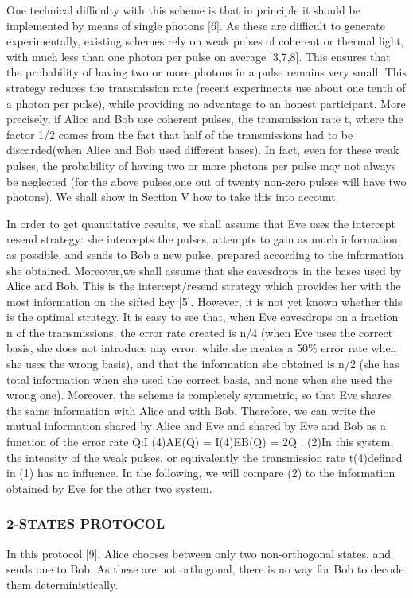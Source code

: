 One technical difficulty with this scheme is that in principle it should be implemented by means of single photons [6]. As these are difficult to generate experimentally, existing schemes rely on weak pulses of coherent or thermal light, with much less than one photon per pulse on average [3,7,8]. This ensures that the probability of having two or more photons in a pulse remains very small. This strategy reduces the transmission rate (recent experiments use about one tenth of a photon per pulse), while providing no advantage to an honest participant. More precisely, if Alice and Bob use coherent pulses, the transmission rate t, where the factor 1/2 comes from the fact that half of the transmissions had to be discarded(when Alice and Bob used different bases). In fact, even for these weak pulses, the probability of having two or more photons per pulse may not always be neglected (for the above pulses,one out of twenty non-zero pulses will have two photons). We shall show in Section V how to take this into account.

In order to get quantitative results, we shall assume that Eve uses the intercept resend strategy: she intercepts the pulses, attempts to gain as much information as possible, and sends to Bob a new pulse, prepared according to the information she obtained. Moreover,we shall assume that she eavesdrops in the bases used by Alice and Bob. This is the intercept/resend strategy which provides her with the most information on the sifted key [5]. However, it is not yet known whether this is the optimal strategy. It is easy to see that, when Eve eavesdrops on a fraction n of the transmissions, the error rate created is n/4 (when Eve uses the correct basis, she does not introduce any error, while she creates a 50\% error rate when she uses the wrong basis), and that the information she obtained is n/2 (she has total information when she used the correct basis, and none when she used the wrong one). Moreover, the scheme is completely symmetric, so that Eve shares the same information with Alice and with Bob. Therefore, we can write the mutual information shared by Alice and Eve and shared by Eve and Bob as a function of the error rate Q:I
(4)AE(Q) = I(4)EB(Q) = 2Q . (2)In this system, the intensity of the weak pulses, or equivalently the transmission rate t(4)defined in (1) has no influence. In the following, we will compare (2) to the information obtained by Eve for the other two system.

\subsubsection*{2-STATES PROTOCOL}
In this protocol [9], Alice chooses between only two non-orthogonal states, and sends one to Bob. As these are not orthogonal, there is no way for Bob to decode them deterministically. 

